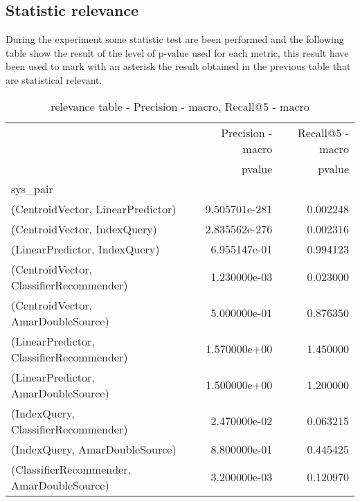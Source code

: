 \documentclass[11pt]{article}
\begin{document}
\subsection{Statistic relevance}\label{subsec:stas_rel}
During the experiment some statistic test are been performed and the following table show the result
of the level of p-value used for each metric, this result have been used to mark with an asterisk
the result obtained in the previous table that are statistical relevant.

\hfill\break
\begin{table}[H]
\centering
\caption{relevance table - Precision - macro, Recall@5 - macro}
\begin{tabular}{lrr}
\toprule
{} & Precision - macro & Recall@5 - macro \\
{} &            pvalue &           pvalue \\
sys\_pair                                  &                   &                  \\
\midrule
(CentroidVector, LinearPredictor)         &     9.505701e-281 &         0.002248 \\
(CentroidVector, IndexQuery)              &     2.835562e-276 &         0.002316 \\
(LinearPredictor, IndexQuery)             &      6.955147e-01 &         0.994123 \\
(CentroidVector, ClassifierRecommender)   &      1.230000e-03 &         0.023000 \\
(CentroidVector, AmarDoubleSource)        &      5.000000e-01 &         0.876350 \\
(LinearPredictor, ClassifierRecommender)  &      1.570000e+00 &         1.450000 \\
(LinearPredictor, AmarDoubleSource)       &      1.500000e+00 &         1.200000 \\
(IndexQuery, ClassifierRecommender)       &      2.470000e-02 &         0.063215 \\
(IndexQuery, AmarDoubleSource)            &      8.800000e-01 &         0.445425 \\
(ClassifierRecommender, AmarDoubleSource) &      3.200000e-03 &         0.120970 \\
\bottomrule
\end{tabular}
\end{table}
\end{document}

